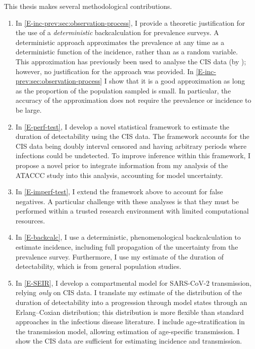 \documentclass[thesis.tex]{subfiles}
\begin{document}
This thesis makes several methodological contributions.
\begin{enumerate}
    \item In \cref{E-inc-prev:sec:observation-process}, I provide a theoretic justification for the use of a \emph{deterministic} backcalculation for prevalence surveys.
    A deterministic approach approximates the prevalence at any time as a deterministic function of the incidence, rather than as a random variable.
    This approximation has previously been used to analyse the CIS data (\eg by \textcite{abbottCISincidence}); however, no justification for the approach was provided.
    In \cref{E-inc-prev:sec:observation-process} I show that it is a good approximation as long as the proportion of the population sampled is small.
    In particular, the accuracy of the approximation does not require the prevalence or incidence to be large.
    
    \item In \cref{E-perf-test}, I develop a novel statistical framework to estimate the duration of detectability using the CIS data.
    The framework accounts for the CIS data being doubly interval censored and having arbitrary periods where infections could be undetected.
    To improve inference within this framework, I propose a novel prior to integrate information from my analysis of the ATACCC study into this analysis, accounting for model uncertainty.
    
    \item In \cref{E-imperf-test}, I extend the framework above to account for false negatives.
    A particular challenge with these analyses is that they must be performed within a trusted research environment with limited computational resources.

    \item In \cref{E-backcalc}, I use a deterministic, phenomenological backcalculation to estimate incidence, including full propagation of the uncertainty from the prevalence survey.
    Furthermore, I use my estimate of the duration of detectability, which is from general population studies.
    
    \item In \cref{E-SEIR}, I develop a compartmental model for SARS-CoV-2 transmission, relying \emph{only} on CIS data. 
    I translate my estimate of the distribution of the duration of detectability into a progression through model states through an Erlang--Coxian distribution; this distribution is more flexible than standard approaches in the infectious disease literature.
    I include age-stratification in the transmission model, allowing estimation of age-specific transmission.
    I show the CIS data are sufficient for estimating incidence and transmission.
\end{enumerate}
\end{document}
